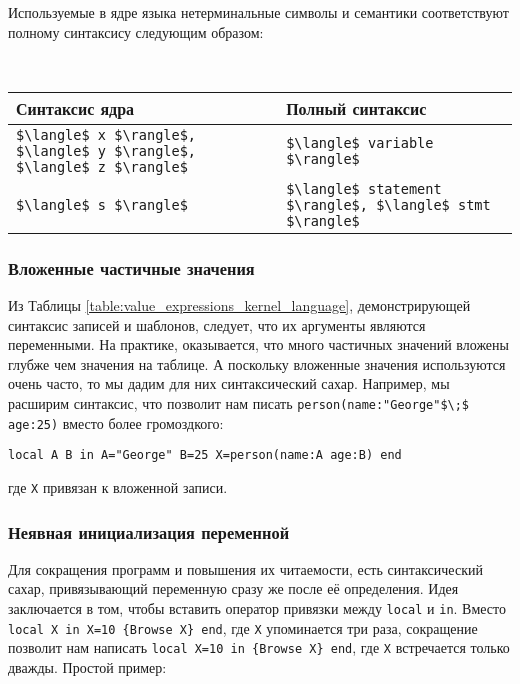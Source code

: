 Используемые в ядре языка нетерминальные символы и семантики соответствуют полному синтаксису следующим образом:

~\\

  \begin{tabular}{ll}
    Синтаксис ядра & Полный синтаксис\\
    \hline
    \lstinline|$\langle$ x $\rangle$, $\langle$ y $\rangle$, $\langle$ z $\rangle$| & \lstinline|$\langle$ variable $\rangle$| \\
    \lstinline|$\langle$ s $\rangle$| & \lstinline|$\langle$ statement $\rangle$, $\langle$ stmt $\rangle$| \\
  \end{tabular}

\subsubsection{Вложенные частичные значения}

Из Таблицы \ref{table:value_expressions_kernel_language}, демонстрирующей синтаксис записей и шаблонов, следует, что их аргументы являются переменными. На практике, оказывается, что много частичных значений вложены глубже чем значения на таблице. А поскольку вложенные значения используются очень часто, то мы дадим для них синтаксический сахар. Например, мы расширим синтаксис, что позволит нам писать \lstinline|person(name:"George"$\;$ age:25)| вместо более громоздкого:

\begin{lstlisting}
local A B in A="George" B=25 X=person(name:A age:B) end
\end{lstlisting}

где \lstinline|X| привязан к вложенной записи.

\subsubsection{Неявная инициализация переменной}

Для сокращения программ и повышения их читаемости, есть синтаксический сахар, привязывающий переменную сразу же после её определения. Идея заключается в том, чтобы вставить оператор привязки между \lstinline|local| и \lstinline|in|. Вместо \lstinline|local X in X=10 {Browse X} end|, где \lstinline|X| упоминается три раза, сокращение позволит нам написать \lstinline|local X=10 in {Browse X} end|, где \lstinline|X| встречается только дважды. Простой пример:

